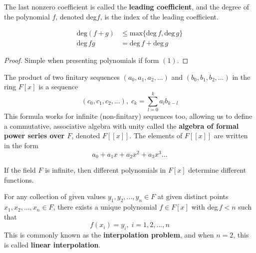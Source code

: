 \documentclass{article}
\begin{document}
      \begin{definition}
        The last nonzero coefficient is called the \textbf{leading coefficient}, and the degree of the polynomial $f$, denoted deg$f$, is the index of the leading coefficient. 
      \end{definition}

      \begin{theorem}
      \begin{align}
        \text{deg}(f+g) & \leq \text{max}\{\text{deg}\,f, \text{deg} \,g\} \\
        \text{deg} \,f g & = \text{deg} \,f + \text{deg} \,g
      \end{align}
      \end{theorem}
      \begin{proof}
        Simple when presenting polynomials if form $(1)$. 
      \end{proof}

      \begin{definition}
        The product of two finitary sequences $(a_0, a_1, a_2, ...)$ and $(b_0, b_1, b_2, ...)$ in the ring $F[x]$ is a sequence 
        \begin{equation}
          (c_0, c_1, c_2, ...), \; c_k = \sum_{l = 0}^{k} a_l b_{k-l}
        \end{equation}
        This formula works for infinite (non-finitary) sequences too, allowing us to define a commutative, associative algebra with unity called the \textbf{algebra of formal power series over $F$}, denoted $F[[x]]$. The elements of $F[[x]]$ are written in the form 
        \begin{equation}
          a_0 + a_1 x + a_2 x^2 + a_3 x^3...
        \end{equation}
      \end{definition}

      \begin{theorem}
        If the field $F$ is infinite, then different polynomials in $F[x]$ determine different functions. 
      \end{theorem}

      \begin{theorem}
        For any collection of given values $y_1, y_2, ..., y_n \in F$ at given distinct points $x_1, x_2, ..., x_n \in F$, there exists a unique polynomial $f \in F[x]$ with deg$\, f < n$ such that
        \begin{equation}
          f(x_i) = y_i, \; i = 1, 2, ..., n
        \end{equation}
        This is commonly known as the \textbf{interpolation problem}, and when $n = 2$, this is called \textbf{linear interpolation}. 
      \end{theorem}
\end{document}
